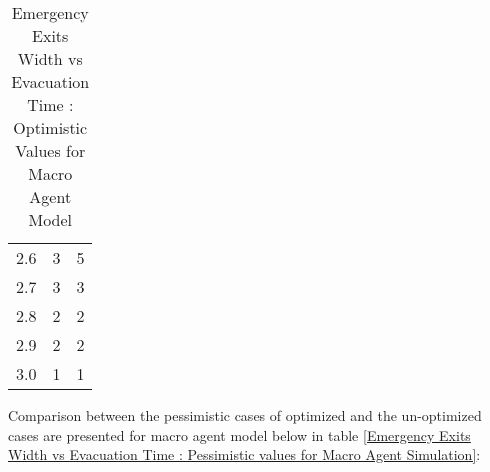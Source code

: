 \begin{table}[H]
{\begin{tabular}{|l|l|l|}
2.6                      & 3                                                                                                                   & 5                                                                                                                  \\
2.7                      & 3                                                                                                                   & 3                                                                                                                  \\
2.8                      & 2                                                                                                                   & 2                                                                                                                  \\
2.9                      & 2                                                                                                                   & 2                                                                                                                  \\
3.0                      & 1                                                                                                                   & 1                                                                                                                  \\
\hline
\end{tabular}}
\caption{Emergency Exits Width vs Evacuation Time : Optimistic Values for Macro Agent Model}
\label{Emergency Exits Width vs Evacuation Time : Optimistic Values for Macro Agent Model}
\end{table}

Comparison between the pessimistic cases of optimized and the un-optimized cases are presented for macro agent model below in table \ref{Emergency Exits Width vs Evacuation Time : Pessimistic values for Macro Agent Simulation}:


